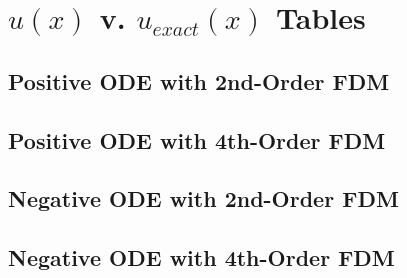 \documentclass[10pt, reqno]{article}		%
\numberwithin{equation}{section}
\begin{document}
\newpage

\appendix

\section{$u(x)$ v. $u_{exact}(x)$ Tables}

\subsection{Positive ODE with 2nd-Order FDM}



\newline


\newline


\newpage

\subsection{Positive ODE with 4th-Order FDM}



\newline


\newline


\newpage

\subsection{Negative ODE with 2nd-Order FDM}



\newline


\newline


\newpage

\subsection{Negative ODE with 4th-Order FDM}


\newline


\newline

\end{document}
